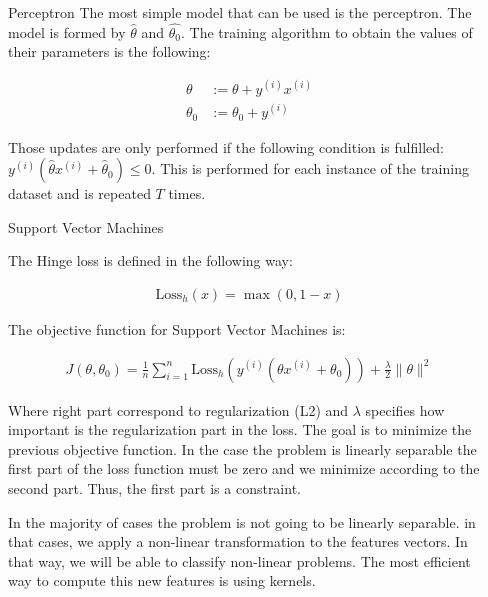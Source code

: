\documentclass{beamer}
\begin{document}
\begin{frame}
\begin{columns}
\begin{column}{0.3\textwidth}
\begin{block}{Perceptron}
The most simple model that can be used is the perceptron. The model is formed by $\hat{\theta}$ and $\hat{\theta_0}$. The training algorithm to obtain the values of their parameters is the following:

\begin{align*}
    \theta &:= \theta + y^{(i)}x^{(i)} \\
    \theta_0 &:= \theta_0 + y^{(i)}
\end{align*}

Those updates are only performed if the following condition is fulfilled: $y^{(i)}(\hat{\theta} x^{(i)} + \hat{\theta}_0) \leq 0$. This is performed for each instance of the training dataset and is repeated $T$ times.

\end{block}

\begin{block}{Support Vector Machines}

The Hinge loss is defined in the following way:

\begin{align*}
    \text{Loss}_h(x) = \max(0, 1 - x)
\end{align*}

The objective function for Support Vector Machines is:

\begin{align*}
    J(\theta, \theta_0) = \frac{1}{n} \sum^n_{i=1} \text{Loss}_h(y^{(i)}(\theta x^{(i)} + \theta_0)) + \frac{\lambda}{2} \lVert \theta \rVert^2
\end{align*}

Where right part correspond to regularization (L2) and $\lambda$ specifies how important is the regularization part in the loss. The goal is to minimize the previous objective function. In the case the problem is linearly separable the first part of the loss function must be zero and we minimize according to the second part. Thus, the first part is a constraint.

In the majority of cases the problem is not going to be linearly separable. in that cases, we apply a non-linear transformation to the features vectors. In that way, we will be able to classify non-linear problems. The most efficient way to compute this new features is using kernels.

\end{block}

\end{column}

\begin{column}{0.3\textwidth}


\end{column}
\end{columns}
\end{frame}
\end{document}
